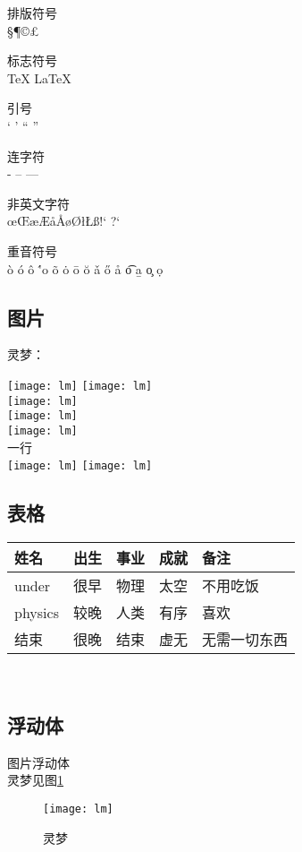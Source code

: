 \documentclass[10pt]{ctexart}%
\begin{document}
	排版符号\\
	\S \P \dag \ddag \copyright \pounds 
	
	标志符号\\
	\TeX{} \LaTeX{} \LaTeXe
	
	引号\\
	` ' `` ''
	
	连字符\\
	- -- ---
	
	非英文字符\\
	\oe \OE \ae \AE \aa \AA \o \O \l \L \ss	!` ?`
	
	重音符号\\
	\`o \'o \^o \''o \~o \.o \=o \u{o} \v{a} \H{o} \r{a} \t{o} \b{a} \c{o} \d{o}
	
	
	\subsection{图片}
	灵梦：
	
	\texttt{[image: lm]}
	\texttt{[image: lm]}\\
	\texttt{[image: lm]}\\
	\texttt{[image: lm]}\\%
	\texttt{[image: lm]}\\%
	一\hfill 行\\
	\texttt{[image: lm]}%
	\texttt{[image: lm]}
	
	\subsection{表格}
	\begin{tabular}{l||c c c| p{1.5cm}}%
		姓名 & 出生 & 事业 & 成就 & 备注\\
		\hline
		under & 很早 & 物理 & 太空 & 不用吃饭\\
		physics & 较晚 & 人类 & 有序 & 喜欢\\
		\hline \hline
		结束 & 很晚 & 结束 & 虚无 & 无需一切东西\\
	\end{tabular}\\
    \subsection{浮动体}%
    图片浮动体\\
    
    灵梦见图\ref{lm}
    \begin{figure}[h]%
    	\centering%
    	\texttt{[image: lm]}
    	\caption{灵梦}
    	\label{lm}
    \end{figure}
\end{document}
